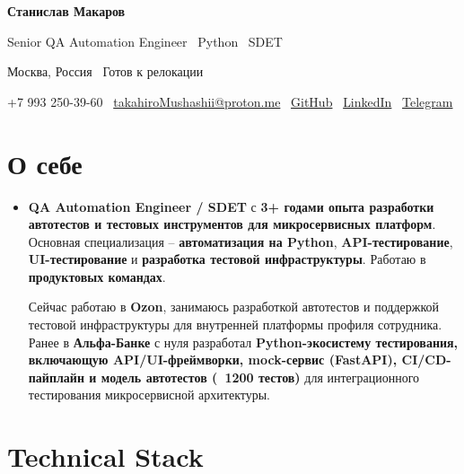 \documentclass[letterpaper,11pt]{article}
\newcommand{\resumeSubHeadingListStart}{\begin{itemize}[leftmargin=0.15in, label={}]}
\newcommand{\resumeSubHeadingListEnd}{\end{itemize}}
\begin{document}

\begin{center}

{\Huge \textbf{Станислав Макаров}}

\vspace{4pt}

{\large Senior QA Automation Engineer \textbar\ Python \textbar\ SDET}

\vspace{4pt}

Москва, Россия \textbullet\ Готов к релокации

\vspace{6pt}

\small
+7 993 250-39-60 \textbar\
\href{mailto:takahiroMushashii@proton.me}{takahiroMushashii@proton.me}
\textbar\
\href{https://github.com/chyioIshi}{GitHub}
\textbar\
\href{https://linkedin.com/in/chyioIshi}{LinkedIn}
\textbar\
\href{https://t.me/makarovsvv}{Telegram}

\end{center}

\section{О себе}
    \resumeSubHeadingListStart
        \item{\textbf{QA Automation Engineer / SDET} с \textbf{3+ годами опыта разработки автотестов и тестовых инструментов для микросервисных платформ}.
        Основная специализация -- \textbf{автоматизация на Python}, \textbf{API-тестирование}, \textbf{UI-тестирование} и \textbf{разработка тестовой инфраструктуры}.
        Работаю в \textbf{продуктовых командах}.

        Сейчас работаю в \textbf{Ozon}, занимаюсь разработкой автотестов и поддержкой тестовой инфраструктуры для внутренней платформы профиля сотрудника.
        Ранее в \textbf{Альфа-Банке} с нуля разработал \textbf{Python-экосистему тестирования, включающую API/UI-фреймворки, mock-сервис (FastAPI), CI/CD-пайплайн
        и модель автотестов (~1200 тестов)} для интеграционного тестирования микросервисной архитектуры.}
    \resumeSubHeadingListEnd

\section{Technical Stack}
\end{document}

